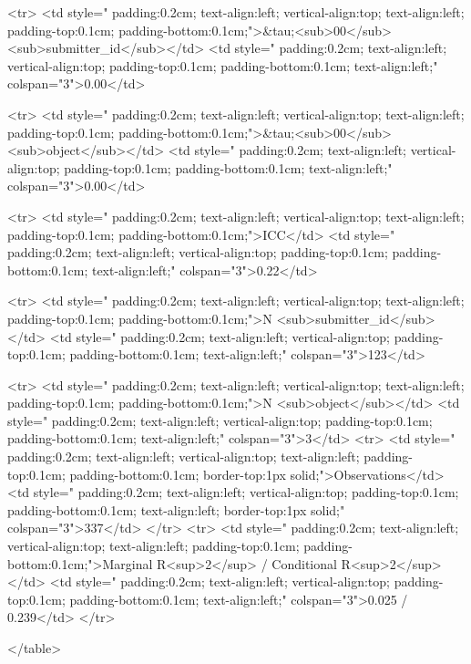<tr>
<td style=" padding:0.2cm; text-align:left; vertical-align:top; text-align:left; padding-top:0.1cm; padding-bottom:0.1cm;">&tau;<sub>00</sub> <sub>submitter_id</sub></td>
<td style=" padding:0.2cm; text-align:left; vertical-align:top; padding-top:0.1cm; padding-bottom:0.1cm; text-align:left;" colspan="3">0.00</td>

<tr>
<td style=" padding:0.2cm; text-align:left; vertical-align:top; text-align:left; padding-top:0.1cm; padding-bottom:0.1cm;">&tau;<sub>00</sub> <sub>object</sub></td>
<td style=" padding:0.2cm; text-align:left; vertical-align:top; padding-top:0.1cm; padding-bottom:0.1cm; text-align:left;" colspan="3">0.00</td>

<tr>
<td style=" padding:0.2cm; text-align:left; vertical-align:top; text-align:left; padding-top:0.1cm; padding-bottom:0.1cm;">ICC</td>
<td style=" padding:0.2cm; text-align:left; vertical-align:top; padding-top:0.1cm; padding-bottom:0.1cm; text-align:left;" colspan="3">0.22</td>

<tr>
<td style=" padding:0.2cm; text-align:left; vertical-align:top; text-align:left; padding-top:0.1cm; padding-bottom:0.1cm;">N <sub>submitter_id</sub></td>
<td style=" padding:0.2cm; text-align:left; vertical-align:top; padding-top:0.1cm; padding-bottom:0.1cm; text-align:left;" colspan="3">123</td>

<tr>
<td style=" padding:0.2cm; text-align:left; vertical-align:top; text-align:left; padding-top:0.1cm; padding-bottom:0.1cm;">N <sub>object</sub></td>
<td style=" padding:0.2cm; text-align:left; vertical-align:top; padding-top:0.1cm; padding-bottom:0.1cm; text-align:left;" colspan="3">3</td>
<tr>
<td style=" padding:0.2cm; text-align:left; vertical-align:top; text-align:left; padding-top:0.1cm; padding-bottom:0.1cm; border-top:1px solid;">Observations</td>
<td style=" padding:0.2cm; text-align:left; vertical-align:top; padding-top:0.1cm; padding-bottom:0.1cm; text-align:left; border-top:1px solid;" colspan="3">337</td>
</tr>
<tr>
<td style=" padding:0.2cm; text-align:left; vertical-align:top; text-align:left; padding-top:0.1cm; padding-bottom:0.1cm;">Marginal R<sup>2</sup> / Conditional R<sup>2</sup></td>
<td style=" padding:0.2cm; text-align:left; vertical-align:top; padding-top:0.1cm; padding-bottom:0.1cm; text-align:left;" colspan="3">0.025 / 0.239</td>
</tr>

</table>

